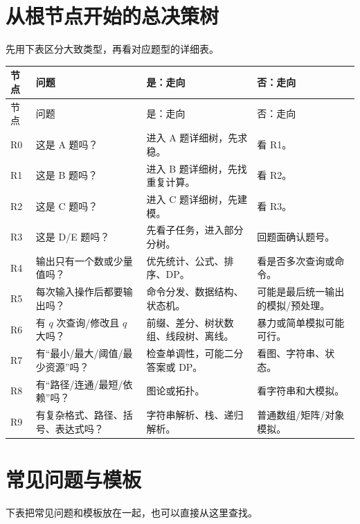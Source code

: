 \section{从根节点开始的总决策树}\label{sec:03-5}

先用下表区分大致类型，再看对应题型的详细表。

\begingroup
\small
\setlength{\tabcolsep}{3pt}
\begin{longtable}{p{1.5cm}p{4.0cm}p{4.9cm}p{4.1cm}}
\toprule
节点 & 问题 & 是：走向 & 否：走向 \\
\midrule
\endfirsthead
\toprule
节点 & 问题 & 是：走向 & 否：走向 \\
\midrule
\endhead
R0 & 这是 A 题吗？ & 进入 A 题详细树，先求稳。 & 看 R1。 \\
R1 & 这是 B 题吗？ & 进入 B 题详细树，先找重复计算。 & 看 R2。 \\
R2 & 这是 C 题吗？ & 进入 C 题详细树，先建模。 & 看 R3。 \\
R3 & 这是 D/E 题吗？ & 先看子任务，进入部分分树。 & 回题面确认题号。 \\
R4 & 输出只有一个数或少量值吗？ & 优先统计、公式、排序、DP。 & 看是否多次查询或命令。 \\
R5 & 每次输入操作后都要输出吗？ & 命令分发、数据结构、状态机。 & 可能是最后统一输出的模拟/预处理。 \\
R6 & 有 $q$ 次查询/修改且 $q$ 大吗？ & 前缀、差分、树状数组、线段树、离线。 & 暴力或简单模拟可能可行。 \\
R7 & 有“最小/最大/阈值/最少资源”吗？ & 检查单调性，可能二分答案或 DP。 & 看图、字符串、状态。 \\
R8 & 有“路径/连通/最短/依赖”吗？ & 图论或拓扑。 & 看字符串和大模拟。 \\
R9 & 有复杂格式、路径、括号、表达式吗？ & 字符串解析、栈、递归解析。 & 普通数组/矩阵/对象模拟。 \\
\bottomrule
\end{longtable}
\endgroup

\section{常见问题与模板}\label{sec:03-6}

下表把常见问题和模板放在一起，也可以直接从这里查找。

